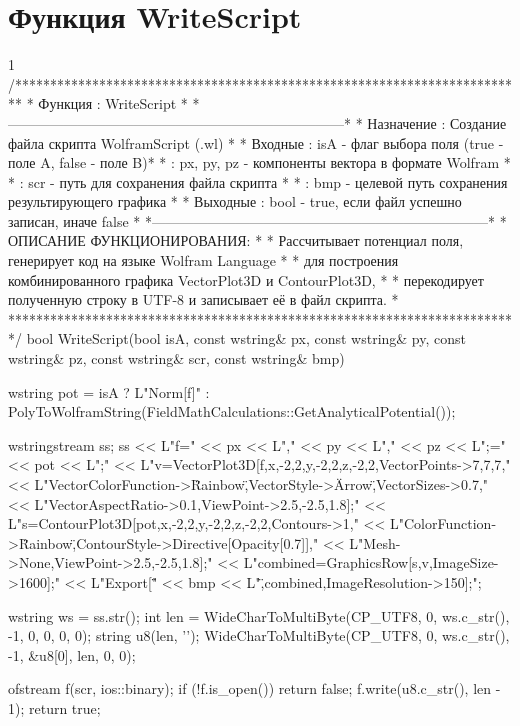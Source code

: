 \section{Функция WriteScript}
\footnotesize
\begin{listing}{1}
/*************************************************************************
* Функция        : WriteScript                                           *
*------------------------------------------------------------------------*
* Назначение     : Создание файла скрипта WolframScript (.wl)            *
* Входные        : isA - флаг выбора поля (true - поле A, false - поле B)*
*                : px, py, pz - компоненты вектора в формате Wolfram     *
*                : scr - путь для сохранения файла скрипта               *
*                : bmp - целевой путь сохранения результирующего графика *
* Выходные       : bool - true, если файл успешно записан, иначе false   *
*------------------------------------------------------------------------*
* ОПИСАНИЕ ФУНКЦИОНИРОВАНИЯ:                                             *
* Рассчитывает потенциал поля, генерирует код на языке Wolfram Language  *
* для построения комбинированного графика VectorPlot3D и ContourPlot3D,  *
* перекодирует полученную строку в UTF-8 и записывает её в файл скрипта. *
*************************************************************************/
bool WriteScript(bool isA, const wstring& px, const wstring& py,
                 const wstring& pz, const wstring& scr, const wstring& bmp) {
    wstring pot = isA ? L"Norm[f]" :
        PolyToWolframString(FieldMathCalculations::GetAnalyticalPotential());
    
    wstringstream ss;
    ss << L"f={" << px << L"," << py << L"," << pz << L"};\npot=" << pot << L";\n"
       << L"v=VectorPlot3D[f,{x,-2,2},{y,-2,2},{z,-2,2},VectorPoints->{7,7,7},"
       << L"VectorColorFunction->\"Rainbow\",VectorStyle->\"Arrow\",VectorSizes->0.7,"
       << L"VectorAspectRatio->0.1,ViewPoint->{2.5,-2.5,1.8}];\n"
       << L"s=ContourPlot3D[pot,{x,-2,2},{y,-2,2},{z,-2,2},Contours->1,"
       << L"ColorFunction->\"Rainbow\",ContourStyle->Directive[Opacity[0.7]],"
       << L"Mesh->None,ViewPoint->{2.5,-2.5,1.8}];\n"
       << L"combined=GraphicsRow[{s,v},ImageSize->1600];\n"
       << L"Export[\"" << bmp << L"\",combined,ImageResolution->150];\n";
    
    wstring ws = ss.str();
    int len = WideCharToMultiByte(CP_UTF8, 0, ws.c_str(), -1, 0, 0, 0, 0);
    string u8(len, '\0');
    WideCharToMultiByte(CP_UTF8, 0, ws.c_str(), -1, &u8[0], len, 0, 0);
    
    ofstream f(scr, ios::binary);
    if (!f.is_open()) return false;
    f.write(u8.c_str(), len - 1);
    return true;
}
\end{listing}
\normalsize

